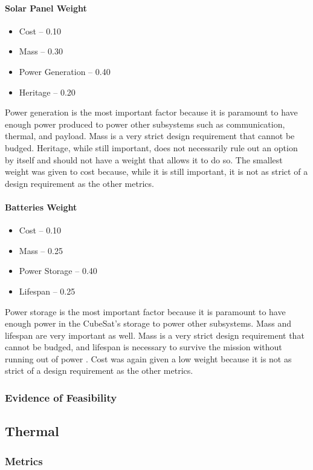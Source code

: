 \documentclass{ece}
\begin{document}
\paragraph{Solar Panel Weight}
\begin{itemize}
    \item Cost – 0.10
    \item Mass – 0.30
    \item Power Generation – 0.40
    \item Heritage – 0.20
\end{itemize}
Power generation is the most important factor because it is paramount to have enough power produced to power other subsystems such as communication, thermal, and payload.  Mass is a very strict design requirement that cannot be budged.  Heritage, while still important, does not necessarily rule out an option by itself and should not have a weight that allows it to do so.  The smallest weight was given to cost because, while it is still important, it is not as strict of a design requirement as the other metrics.
\paragraph{Batteries Weight}
\begin{itemize}
    \item Cost – 0.10
    \item Mass – 0.25
    \item Power Storage – 0.40
    \item Lifespan – 0.25
\end{itemize}    
Power storage is the most important factor because it is paramount to have enough power in the CubeSat's storage to power other subsystems.  Mass and lifespan are very important as well.  Mass is a very strict design requirement that cannot be budged, and lifespan is necessary to survive the mission without running out of power .  Cost was again given a low weight because it is not as strict of a design requirement as the other metrics.
\subsubsection{Evidence of Feasibility}
\subsection{Thermal}
\subsubsection{Metrics}
\end{document}
